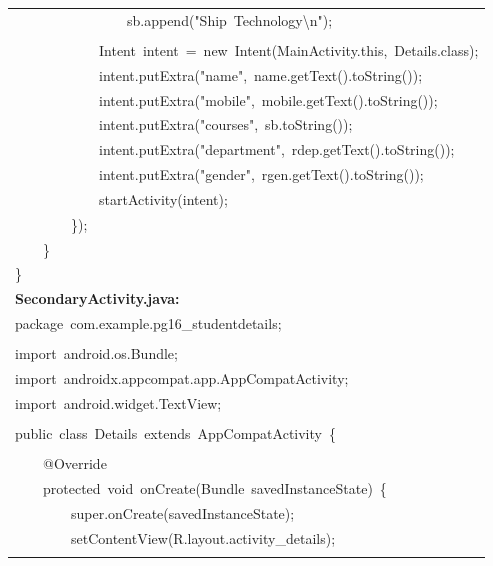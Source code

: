 \documentclass[a4paper,12pt]{article}
\begin{document}
\begin{longtable}{|p{}|}
{\ttfamily\small \ \ \ \ \ \ \ \ \ \ \ \ \ \ \ \ sb.append("Ship\ Technology\textbackslash{}n");} \\
\strut \\
{\ttfamily\small \ \ \ \ \ \ \ \ \ \ \ \ Intent\ intent\ =\ new\ Intent(MainActivity.this,\ Details.class);} \\
{\ttfamily\small \ \ \ \ \ \ \ \ \ \ \ \ intent.putExtra("name",\ name.getText().toString());} \\
{\ttfamily\small \ \ \ \ \ \ \ \ \ \ \ \ intent.putExtra("mobile",\ mobile.getText().toString());} \\
{\ttfamily\small \ \ \ \ \ \ \ \ \ \ \ \ intent.putExtra("courses",\ sb.toString());} \\
{\ttfamily\small \ \ \ \ \ \ \ \ \ \ \ \ intent.putExtra("department",\ rdep.getText().toString());} \\
{\ttfamily\small \ \ \ \ \ \ \ \ \ \ \ \ intent.putExtra("gender",\ rgen.getText().toString());} \\
{\ttfamily\small \ \ \ \ \ \ \ \ \ \ \ \ startActivity(intent);} \\
{\ttfamily\small \ \ \ \ \ \ \ \ \});} \\
{\ttfamily\small \ \ \ \ \}} \\
{\ttfamily\small \}} \\
\hline
\rule{0pt}{13pt}\textbf{SecondaryActivity.java:} \\
\hline
{\ttfamily\small package\ com.example.pg16\_studentdetails;} \\
\strut \\
{\ttfamily\small import\ android.os.Bundle;} \\
{\ttfamily\small import\ androidx.appcompat.app.AppCompatActivity;} \\
{\ttfamily\small import\ android.widget.TextView;} \\
\strut \\
{\ttfamily\small public\ class\ Details\ extends\ AppCompatActivity\ \{} \\
\strut \\
{\ttfamily\small \ \ \ \ @Override} \\
{\ttfamily\small \ \ \ \ protected\ void\ onCreate(Bundle\ savedInstanceState)\ \{} \\
{\ttfamily\small \ \ \ \ \ \ \ \ super.onCreate(savedInstanceState);} \\
{\ttfamily\small \ \ \ \ \ \ \ \ setContentView(R.layout.activity\_details);} \\
\strut \\

\end{longtable}
\end{document}
